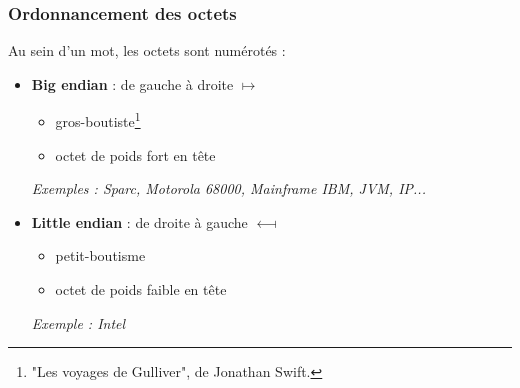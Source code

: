 \begin{frame}
\frametitle{Ordonnancement des octets}
Au sein d'un mot, les octets sont numérotés :
\begin{itemize}
\item <1> \textbf{Big endian} : de gauche à droite $\longmapsto$
\begin{itemize}
\item gros-boutiste\footnote{"Les voyages de Gulliver", de Jonathan Swift.}
\item octet de poids fort en tête
\end{itemize}
\small{\textit{Exemples : Sparc, Motorola 68000, Mainframe IBM, JVM, IP...}}

\item <2> \textbf{Little endian} : de droite à gauche $\longmapsfrom$
\begin{itemize}
\item petit-boutisme
\item octet de poids faible en tête
\end{itemize}
\small{\textit{Exemple : Intel}}
\end{itemize}
\end{frame}

